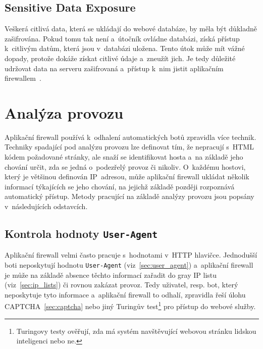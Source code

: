 \subsection*{Sensitive Data Exposure} 
Veškerá citlivá data, která se ukládají do webové databáze, by měla být důkladně zašifrována. Pokud tomu tak není a~útočník ovládne databázi, získá přístup k~citlivým datům, která jsou v~databázi uložena. Tento útok může mít vážné dopady, protože dokáže získat citlivé údaje a~zneužít jich. Je tedy důležité udržovat data na serveru zašifrovaná a~přístup k~nim jistit aplikačním firewallem~\cite{bib:sensitive_data_exposure}.


\section{Analýza provozu}
Aplikační firewall používá k~odhalení automatických botů zpravidla více technik. Techniky spadající pod analýzu provozu lze definovat tím, že nepracují s~HTML kódem požadované stránky, ale snaží se identifikovat hosta a~na základě jeho chování určit, zda se jedná o~podezřelý provoz či nikoliv. O~každému hostovi, který je většinou definován IP~adresou, může aplikační firewall ukládat několik informací týkajících se jeho chování, na jejichž základě později rozpoznává automatický přístup. Metody pracující na základě analýzy provozu jsou popsány v~následujících odstavcích.

\subsection*{Kontrola hodnoty \texttt{User-Agent}}
Aplikační firewall velmi často pracuje s~hodnotami v~HTTP hlavičce. Jednodušší boti neposkytují hodnotu \texttt{User-Agent} (viz~\ref{sec:user_agent}) a~aplikační firewall je může na základě absence těchto informací zařadit do gray IP listu (viz~\ref{sec:ip_lists}) či rovnou zakázat provoz. Tedy uživatel, resp. bot, který neposkytuje tyto informace a~aplikační firewall to odhalí, zpravidla řeší úlohu CAPTCHA~\ref{sec:captcha} nebo jiný Turingův test\footnote{Turingovy testy ověřují, zda má systém navštěvující webovou stránku lidskou inteligenci nebo ne.} pro přístup do webové služby.

